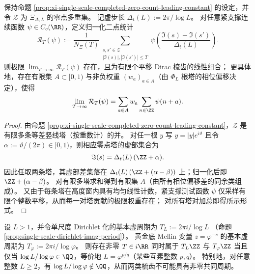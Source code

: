 \begin{proposition}\label{prop:xi-single-scale-two-point-correlation-comb}
保持命题 \ref{prop:xi-single-scale-completed-zero-count-leading-constant} 的设定，并令 \(\mathcal Z\) 为 \(\Xi_{\Delta,L}\) 的零点多重集。
记虚步长
\(
\Delta_t(L):=2\pi/\log L
\)。
对任意紧支撑连续函数 \(\psi\in C_c(\RR)\)，定义归一化二点统计
\[
\mathcal R_T(\psi)
:=\frac{1}{N_{\Xi}(T)}
\sum_{\substack{s,s'\in\mathcal Z\\ |\Im(s)|,|\Im(s')|\le T}}
\psi\!\left(\frac{\Im(s)-\Im(s')}{\Delta_t(L)}\right).
\]
则极限 \(\lim_{T\to\infty}\mathcal R_T(\psi)\) 存在，且为有限个平移 Dirac 梳齿的线性组合；
更具体地，存在有限集 \(A\subset[0,1)\) 与非负权重 \((w_a)_{a\in A}\)（由 \(\Phi_L\) 根塔的相位偏移决定），使得
\[
\lim_{T\to\infty}\mathcal R_T(\psi)
=\sum_{a\in A} w_a\sum_{n\in\ZZ}\psi(n+a).
\]
\end{proposition}

\begin{proof}
由命题 \ref{prop:xi-single-scale-completed-zero-count-leading-constant}，\(\mathcal Z\) 是有限多条等差竖线塔（按重数计）的并。
对任一根 \(y\) 写 \(y=|y|e^{i\vartheta}\) 且令 \(\alpha:=\vartheta/(2\pi)\in[0,1)\)，则相应零点塔的虚部集合为
\[
\Im(s)=\Delta_t(L)\,(\ZZ+\alpha).
\]
因此任取两条塔，其虚部差集落在
\(
\Delta_t(L)\,(\ZZ+(\alpha-\beta))
\)
上；归一化后即 \(\ZZ+(\alpha-\beta)\)。
对有限多塔求和得到有限集 \(A\)（由所有相位偏移差的同余类组成）。
又由于每条塔在高度窗内具有均匀线性计数，紧支撑测试函数 \(\psi\) 仅采样有限个整数平移，从而每一对塔贡献的极限权重存在；
对所有塔对加总即得所示形式。
\end{proof}

\begin{proposition}\label{prop:xi-comb-incommensurability-logL-logphi}
设 \(L>1\)，并令单尺度 Dirichlet 化的基本虚周期为
\(
T_L:=2\pi i/\log L
\)
（命题 \ref{prop:single-scale-dirichlet-imag-period}）。
黄金底 Mellin 变量 \(z=\varphi^{-s}\) 的基本虚周期为
\(
T_\varphi:=2\pi i/\log\varphi
\)。
则存在非零 \(T\in i\RR\) 同时属于 \(T_L\ZZ\) 与 \(T_\varphi\ZZ\) 当且仅当 \(\log L/\log\varphi\in\QQ\)，等价地 \(L=\varphi^{p/q}\)（某些互素整数 \(p,q\)）。
特别地，对任意整数 \(L\ge 2\)，有 \(\log L/\log\varphi\notin\QQ\)，从而两类梳齿不可能具有非零共同周期。
\end{proposition}

